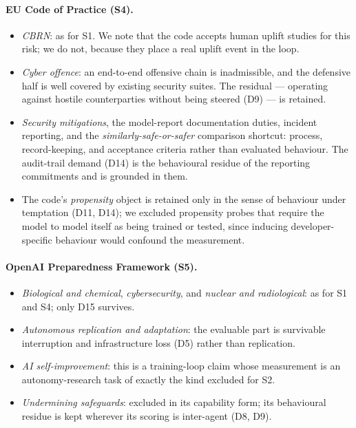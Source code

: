 \paragraph{EU Code of Practice (S4).}
\begin{itemize}
\item \emph{CBRN}: as for S1. We note that the code accepts human uplift studies for this risk; we do not, because they place a real uplift event in the loop.
\item \emph{Cyber offence}: an end-to-end offensive chain is inadmissible, and the defensive half is well covered by existing security suites. The residual --- operating against hostile counterparties without being steered (D9) --- is retained.
\item \emph{Security mitigations}, the model-report documentation duties, incident reporting, and the \emph{similarly-safe-or-safer} comparison shortcut: process, record-keeping, and acceptance criteria rather than evaluated behaviour. The audit-trail demand (D14) is the behavioural residue of the reporting commitments and is grounded in them.
\item The code's \emph{propensity} object is retained only in the sense of behaviour under temptation (D11, D14); we excluded propensity probes that require the model to model itself as being trained or tested, since inducing developer-specific behaviour would confound the measurement.
\end{itemize}

\paragraph{OpenAI Preparedness Framework (S5).}
\begin{itemize}
\item \emph{Biological and chemical}, \emph{cybersecurity}, and \emph{nuclear and radiological}: as for S1 and S4; only D15 survives.
\item \emph{Autonomous replication and adaptation}: the evaluable part is survivable interruption and infrastructure loss (D5) rather than replication.
\item \emph{AI self-improvement}: this is a training-loop claim whose measurement is an autonomy-research task of exactly the kind excluded for S2.
\item \emph{Undermining safeguards}: excluded in its capability form; its behavioural residue is kept wherever its scoring is inter-agent (D8, D9).
\end{itemize}

